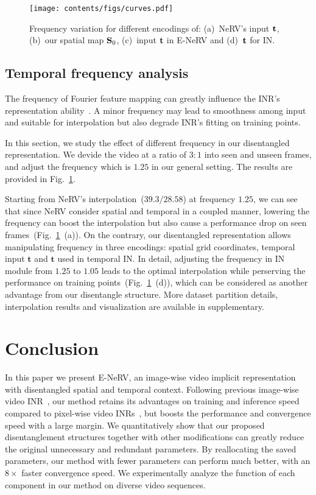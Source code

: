 \documentclass[runningheads]{llncs}
\begin{document}
\begin{figure}[t]
    \centering
    \texttt{[image: contents/figs/curves.pdf]}
    \caption{Frequency variation for different encodings of: (a)~NeRV's input $\mathbf{t}$, (b)~our spatial map $\mathbf{S}_0$, (c)~input $\mathbf{t}$ in E-NeRV and (d)~$\mathbf{t}$ for IN.}
    \label{fig:freq_small_exp}
\end{figure}

\subsection{Temporal frequency analysis}
\label{temporal_freq_exp}

The frequency of Fourier feature mapping can greatly influence the INR's representation ability~\cite{tancik2020fourier}. A minor frequency may lead to smoothness among input and suitable for interpolation but also degrade INR's fitting on training points.

In this section, we study the effect of different frequency in our disentangled representation. We devide the video at a ratio of $3 : 1$ into seen and unseen frames, and adjust the frequency which is $1.25$ in our general setting.  The results are provided in Fig.~\ref{fig:freq_small_exp}.

Starting from NeRV's interpolation~($39.3/28.58$) at frequency $1.25$, we can see that since NeRV consider spatial and temporal in a coupled manner, lowering the frequency can boost the interpolation but also cause a performance drop on seen frames~(Fig.~\ref{fig:freq_small_exp}~(a)). On the contrary, our disentangled representation allows manipulating frequency in three encodings: spatial grid coordinates, temporal input $\mathbf{t}$ and $\mathbf{t}$ used in temporal IN. In detail, adjusting the frequency in IN module from $1.25$ to $1.05$ leads to the optimal interpolation while perserving the performance on training points~(Fig.~\ref{fig:freq_small_exp}~(d)), which can be considered as another advantage from our disentangle structure. More dataset partition details, interpolation results and visualization are available in supplementary. \section{Conclusion}
\label{conclusion}

In this paper we present E-NeRV, an image-wise video implicit representation with disentangled spatial and temporal context. Following previous image-wise video INR~\cite{chen2021nerv}, our method retains its advantages on training and inference speed compared to pixel-wise video INRs~\cite{tancik2020fourier,sitzmann2020implicit,mehta2021modulated}, but boosts the performance and convergence speed with a large margin. We quantitatively show that our proposed disentanglement structures together with other modifications can greatly reduce the original unnecessary and redundant parameters. By reallocating the saved parameters, our method with fewer parameters can perform much better, with an $8\times$ faster convergence speed. We experimentally analyze the function of each component in our method on diverse video sequences.
\end{document}
